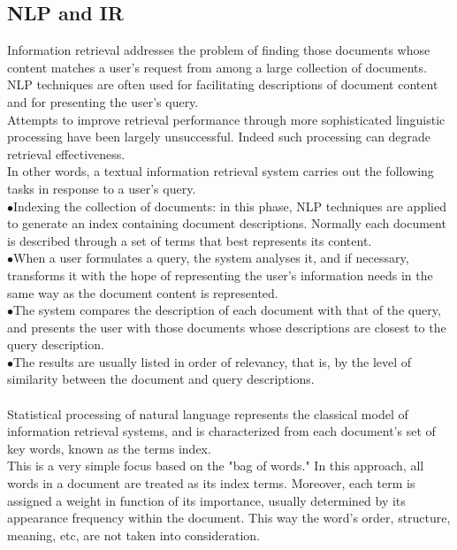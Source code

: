 \subsection{NLP and IR}
Information retrieval addresses the problem of finding those documents whose content matches a user's request from among a large collection of documents.
NLP techniques are often used for facilitating descriptions of document content and for presenting the user's query.\\Attempts to improve retrieval performance through more sophisticated linguistic processing have been largely unsuccessful. Indeed such processing can degrade retrieval effectiveness.\\
In other words, a textual information retrieval system carries out the following tasks in response to a user's query.\\
\indent$\bullet$Indexing the collection of documents: in this phase, NLP techniques are applied to generate an index containing document descriptions. Normally each document is described through a set of terms that best represents its content.\\
\indent$\bullet$When a user formulates a query, the system analyses it, and if necessary, transforms it with the hope of representing the user's information needs in the same way as the document content is represented.\\
\indent$\bullet$The system compares the description of each document with that of the query, and presents the user with those documents whose descriptions are closest to the query description.\\
\indent$\bullet$The results are usually listed in order of relevancy, that is, by the level of similarity between the document and query descriptions.
\\\\
Statistical processing of natural language represents the classical model of information retrieval systems, and is characterized from each document's set of key words, known as the terms index.\\
This is a very simple focus based on the "bag of words." In this approach, all words in a document are treated as its index terms. Moreover, each term is assigned a weight in function of its importance, usually determined by its appearance frequency within the document. This way the word's order, structure, meaning, etc, are not taken into consideration.\\
